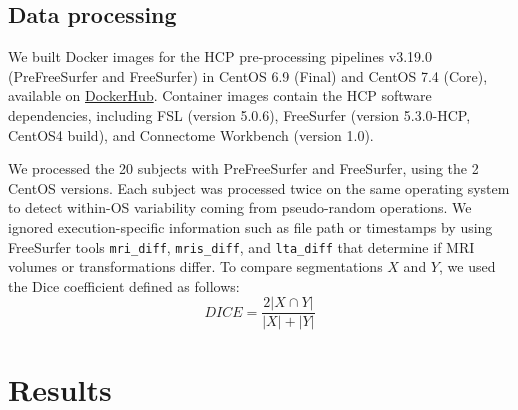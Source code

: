 \documentclass[a4paper,num-refs]{oup-contemporary}
\begin{document}

\subsection{Data processing}

We built Docker images for the HCP pre-processing pipelines v3.19.0
(PreFreeSurfer and FreeSurfer) in CentOS 6.9 (Final) and CentOS 7.4 (Core), available on
\href{https://hub.docker.com/r/bigdatalabteam/hcp-prefreesurfer/}{DockerHub}.
Container images contain the HCP software dependencies, including FSL
(version 5.0.6), FreeSurfer (version 5.3.0-HCP, CentOS4 build), and
Connectome Workbench (version 1.0).

We processed the 20 subjects with PreFreeSurfer and FreeSurfer, using the 2
CentOS versions. Each subject was processed twice on the same operating
system to detect within-OS variability coming from pseudo-random
operations. We ignored execution-specific information such as file path or
timestamps by using FreeSurfer tools \texttt{mri\_diff},
\texttt{mris\_diff}, and \texttt{lta\_diff} that determine if MRI volumes
or transformations differ. To compare segmentations $X$ and $Y$, we used the Dice coefficient defined as follows:
\[DICE=\frac{2|X \cap Y|}{|X| + |Y|}\]


\section{Results}

\end{document}
